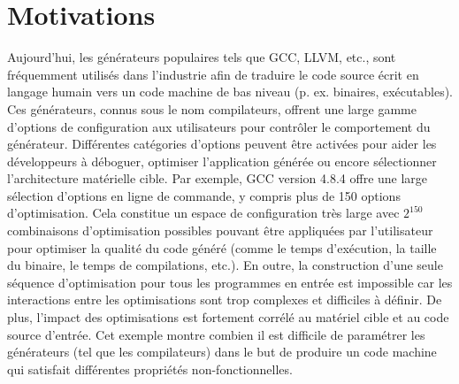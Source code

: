 \section*{Motivations}
Aujourd'hui, les g\'en\'erateurs populaires tels que GCC, LLVM, etc., sont fr\'equemment utilis\'es dans l'industrie afin de traduire le code source \'ecrit en langage humain vers un code machine de bas niveau (p. ex. binaires,  ex\'ecutables). Ces g\'en\'erateurs, connus sous le nom compilateurs, offrent une large gamme d'options de configuration aux utilisateurs pour contr\^oler le comportement du g\'en\'erateur.
Diff\'erentes cat\'egories d'options peuvent \^etre activ\'ees pour aider les d\'eveloppeurs \`a d\'eboguer, optimiser l'application g\'en\'er\'ee ou encore s\'electionner l'architecture mat\'erielle cible. 
Par exemple, GCC version 4.8.4 offre une large s\'election d'options en ligne de commande, y compris plus de 150 options d'optimisation. Cela constitue un espace de configuration tr\`es large avec $2^{150}$  combinaisons d'optimisation possibles pouvant \^etre appliqu\'ees par l'utilisateur pour optimiser la qualit\'e du code g\'en\'er\'e (comme le temps d'ex\'ecution, la taille du binaire, le temps de compilations, etc.). En outre, la construction d'une seule s\'equence d'optimisation pour tous les programmes en entr\'ee est impossible car les interactions entre les optimisations sont trop complexes et difficiles \`a d\'efinir. De plus, l'impact des optimisations est fortement corr\'el\'e au mat\'eriel cible et au code source d'entr\'ee.
Cet exemple montre combien il est difficile de param\'etrer les g\'en\'erateurs (tel que les compilateurs) dans le but de produire un code machine qui satisfait diff\'erentes propri\'et\'es non-fonctionnelles.

